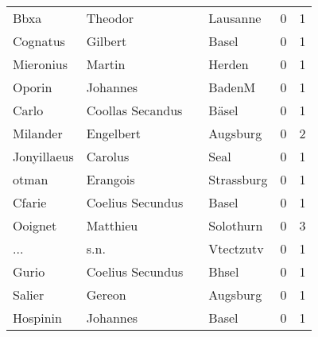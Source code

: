 \begin{tabular}{llllrr}
                     Bbxa &                            Theodor &             &                                    Lausanne &          0 &         1 \\
                 Cognatus &                            Gilbert &             &                                       Basel &          0 &         1 \\
                Mieronius &                             Martin &             &                                      Herden &          0 &         1 \\
                   Oporin &                           Johannes &             &                                      BadenM &          0 &         1 \\
                    Carlo &                   Coollas Secandus &             &                                       Bäsel &          0 &         1 \\
                 Milander &                          Engelbert &             &                                    Augsburg &          0 &         2 \\
              Jonyillaeus &                            Carolus &             &                                        Seal &          0 &         1 \\
                    otman &                           Erangois &             &                                  Strassburg &          0 &         1 \\
                   Cfarie &                   Coelius Secundus &             &                                       Basel &          0 &         1 \\
                  Ooignet &                           Matthieu &             &                                   Solothurn &          0 &         3 \\
                      ... &                               s.n. &             &                                   Vtectzutv &          0 &         1 \\
                    Gurio &                   Coelius Secundus &             &                                       Bhsel &          0 &         1 \\
                   Salier &                             Gereon &             &                                    Augsburg &          0 &         1 \\
                 Hospinin &                           Johannes &             &                                       Basel &          0 &         1 \\

\end{tabular}

